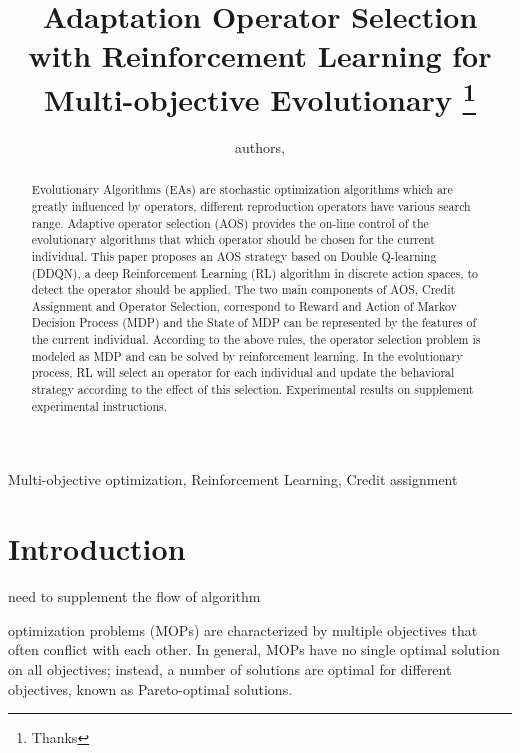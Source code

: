 \documentclass[journal]{IEEEtran}
\newcommand{\TODO}[1]{\textcolor[rgb]{1.00,0.40,0.22}{#1}}
\begin{document}
\title{{Adaptation Operator Selection with Reinforcement Learning for Multi-objective Evolutionary}
  \thanks{Thanks}}
\author{
  authors,
}%



\maketitle

\begin{abstract}
  Evolutionary Algorithms (EAs) are stochastic optimization algorithms which are greatly influenced by operators, different reproduction operators have various search range.
  Adaptive operator selection (AOS) provides the on-line control of the evolutionary algorithms that which operator should be chosen for the current individual.
  This paper proposes an AOS strategy based on Double Q-learning (DDQN), a deep Reinforcement Learning (RL) algorithm in discrete action spaces, to detect the operator should be applied.
  The two main components of AOS, Credit Assignment and Operator Selection, correspond to Reward and Action of Markov Decision Process (MDP) and the State of MDP can be represented by the features of the current individual. According to the above rules, the operator selection problem is modeled as MDP and can be solved by reinforcement learning. In the evolutionary process, RL will select an operator for each individual and update the behavioral strategy according to the effect of this selection. Experimental results on \TODO{supplement experimental instructions}.
\end{abstract}

\begin{IEEEkeywords}
  Multi-objective optimization, Reinforcement Learning, Credit assignment
\end{IEEEkeywords}

\section{Introduction}
\TODO{ need to supplement the flow of algorithm}

 optimization problems (MOPs) are characterized by multiple objectives that often conflict with each other\cite{zhang2014efficient}. In general, MOPs have no single optimal solution on all objectives; instead, a number of solutions are optimal for different objectives, known as Pareto-optimal solutions.
\end{document}
